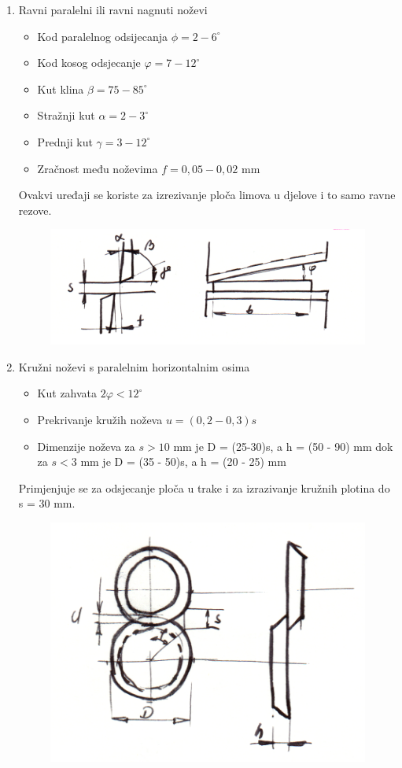 \documentclass[a4paper,12pt]{article}
\numberwithin{figure}{section}
\begin{document}
\begin{enumerate}
\item Ravni paralelni ili ravni nagnuti noževi
\begin{itemize}
\item Kod paralelnog odsijecanja $\phi = 2-6^{\circ}$
\item Kod kosog odsjecanje $\varphi = 7-12^{\circ}$
\item Kut klina $\beta = 75-85^{\circ}$
\item Stražnji kut $\alpha = 2-3^{\circ}$
\item Prednji kut $\gamma = 3-12^{\circ}$
\item Zračnost među noževima $f=0,05-0,02$ mm 
\end{itemize}
Ovakvi uređaji se koriste za izrezivanje ploča limova u djelove i to samo ravne rezove.
\begin{figure}[!h]
\centering
\includegraphics[scale=0.2]{image_54-1.png}
\end{figure}
\FloatBarrier
\item Kružni noževi s paralelnim horizontalnim osima
\begin{itemize}
\item Kut zahvata $2\varphi<12^{\circ}$
\item Prekrivanje kružih noževa  $u = (0,2-0,3)s$
\item Dimenzije noževa za $s>10$ mm je D = (25-30)s, a h = (50 - 90) mm dok za $s<3$ mm je D = (35 - 50)s, a h = (20 - 25) mm
\end{itemize}
Primjenjuje se za odsjecanje ploča u trake i za izrazivanje kružnih plotina do s = 30 mm.
\begin{figure}[!h]
\centering
\includegraphics[scale=0.2]{image_54-2.png}

\end{figure}
\end{enumerate}
\end{document}
